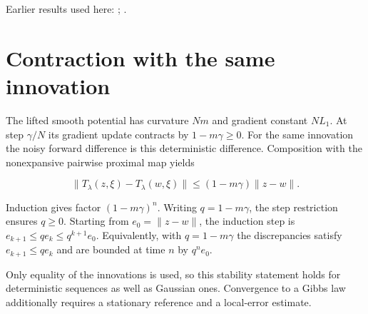 \documentclass[11pt,a4paper]{article}
\begin{document}
Earlier results used here: \cite[Section~3.1.1]{LangevinLean2026IPLA}; \cite[Section~3.1.2]{LangevinLean2026IPLA}.

\section{\texorpdfstring{Contraction with the same innovation}{Contraction with the same innovation}}


The lifted smooth potential has curvature \(Nm\) and gradient constant \(NL_1\). At step \(\gamma/N\) its gradient update contracts by \(1-m\gamma\ge0\). For the same innovation the noisy forward difference is this deterministic difference. Composition with the nonexpansive pairwise proximal map yields

\[\|T_\lambda(z,\xi)-T_\lambda(w,\xi)\|\le(1-m\gamma)\|z-w\|.\]

Induction gives factor \((1-m\gamma)^n\). Writing \(q=1-m\gamma\), the step restriction ensures \(q\ge0\). Starting from \(e_0=\|z-w\|\), the induction step is \(e_{k+1}\le q e_k\le q^{k+1}e_0\). Equivalently, with \(q=1-m\gamma\) the discrepancies satisfy \(e_{k+1}\le q e_k\) and are bounded at time \(n\) by \(q^n e_0\).



Only equality of the innovations is used, so this stability statement holds for deterministic sequences as well as Gaussian ones. Convergence to a Gibbs law additionally requires a stationary reference and a local-error estimate.
\end{document}
